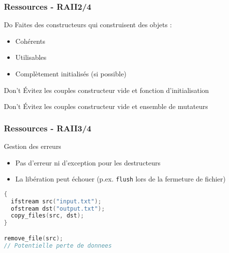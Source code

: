 \documentclass[C++.tex]{subfiles}
\begin{document}
\begin{frame}
	\frametitle{Ressources - RAII\titlehfill{}2/4}
	\begin{exampleblock}{Do}
		Faites des constructeurs qui construisent des objets :
		\begin{itemize}
			\item Cohérents
			\item Utilisables
			\item Complètement initialisés (si possible)
		\end{itemize}
	\end{exampleblock}

	\begin{alertblock}{Don't}
		Évitez les couples constructeur \og vide\fg{} et fonction d'initialisation

	\end{alertblock}

	\begin{alertblock}{Don't}
		Évitez les couples constructeur \og vide\fg{} et ensemble de mutateurs

	\end{alertblock}
\end{frame}

\begin{frame}[fragile]
	\frametitle{Ressources - RAII\titlehfill{}3/4}
	\begin{alertblock}{Gestion des erreurs}
		\begin{itemize}
			\item Pas d'erreur ni d'exception pour les destructeurs
			\item La libération peut échouer (p.ex. \lstinline|flush| lors de la fermeture de fichier)

		\end{itemize}
	\end{alertblock}

	\begin{lstlisting}[language=C++]
{
  ifstream src("input.txt");
  ofstream dst("output.txt");
  copy_files(src, dst);
}

remove_file(src);
// Potentielle perte de donnees\end{lstlisting}

\end{frame}
\end{document}
